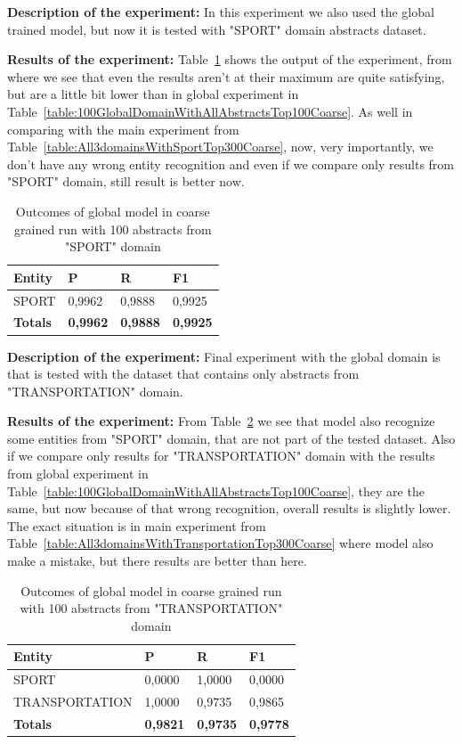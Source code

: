 \documentclass[thesis=M,english]{FITthesis}[2018/05/30]
\begin{document}
	\textbf{Description of the experiment:} In this experiment we also used the global trained model, but now it is tested with "SPORT" domain abstracts dataset.

	\textbf{Results of the experiment:} Table~\ref{table:100GlobalDomainWithSportTop100Coarse} shows the output of the experiment, from where we see that even the results aren't at their maximum are quite satisfying, but are a little bit lower than in global experiment in Table~\ref{table:100GlobalDomainWithAllAbstractsTop100Coarse}. As well in comparing with the main experiment from Table~\ref{table:All3domainsWithSportTop300Coarse}, now, very importantly, we don't have any wrong entity recognition and even if we compare only results from "SPORT" domain, still result is better now.

	\begin{table}[H]\centering
		\begin{tabular}{|l|l|l|l|}
			\hline {\textbf{Entity}} & {\textbf{P}} & {\textbf{R}} & {\textbf{F1}}\\\hline
				SPORT & 0,9962 & 0,9888 & 0,9925\\\hline
				\textbf{Totals} & \textbf{0,9962} & \textbf{0,9888} & \textbf{0,9925}\\\hline
		\end{tabular}
		\caption{Outcomes of global model in coarse grained run with 100 abstracts from "SPORT" domain \label{table:100GlobalDomainWithSportTop100Coarse}}
	\end{table}	


	\textbf{Description of the experiment:} Final experiment with the global domain is that is tested with the dataset that contains only abstracts from "TRANSPORTATION" domain.

	\textbf{Results of the experiment:} From Table~\ref{table:100GlobalDomainWithTransportationTop100Coarse} we see that model also recognize some entities from "SPORT" domain, that are not part of the tested dataset. Also if we compare only results for "TRANSPORTATION" domain with the results from global experiment in Table~\ref{table:100GlobalDomainWithAllAbstractsTop100Coarse}, they are the same, but now because of that wrong recognition, overall results is slightly lower. The exact situation is in main experiment from Table~\ref{table:All3domainsWithTransportationTop300Coarse} where model also make a mistake, but there results are better than here.

	\begin{table}[H]\centering
		\begin{tabular}{|l|l|l|l|}
			\hline {\textbf{Entity}} & {\textbf{P}} & {\textbf{R}} & {\textbf{F1}}\\\hline
				SPORT & 0,0000 & 1,0000 & 0,0000\\
				TRANSPORTATION & 1,0000 & 0,9735 & 0,9865\\\hline
				\textbf{Totals} & \textbf{0,9821} & \textbf{0,9735} & \textbf{0,9778}\\\hline
		\end{tabular}
		\caption{Outcomes of global model in coarse grained run with 100 abstracts from "TRANSPORTATION" domain \label{table:100GlobalDomainWithTransportationTop100Coarse}}
	\end{table}	
		
\end{document}
